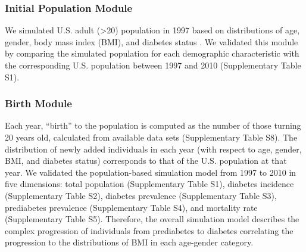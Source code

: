 \documentclass[fleqn,10pt]{wlscirep}
\begin{document}
\subsubsection*{Initial Population Module} 
We simulated U.S. adult (>20) population in 1997 based on distributions of age, gender, body mass index (BMI), and diabetes status \cite{mcdowell:anthropometric:2005,mcdowell:anthropometric:2008,fryar:anthropometric:2012}. We validated this module by comparing the simulated population for each demographic characteristic with the corresponding U.S. population between 1997 and 2010 (Supplementary Table S1).

\subsubsection*{Birth Module}
Each year, ``birth'' to the population is computed as the number of those turning 20 years old, calculated from available data sets (Supplementary Table S8). The distribution of newly added individuals in each year (with respect to age, gender, BMI, and diabetes status) corresponds to that of the U.S. population at that year. 
We validated the population-based simulation model from 1997 to 2010 in five dimensions: total population (Supplementary Table S1), diabetes incidence (Supplementary Table S2), diabetes prevalence (Supplementary Table S3), prediabetes prevalence (Supplementary Table S4), and mortality rate (Supplementary Table S5). Therefore, the overall simulation model describes the complex progression of individuals from prediabetes to diabetes correlating the progression to the distributions of BMI in each age-gender category.
\end{document}
